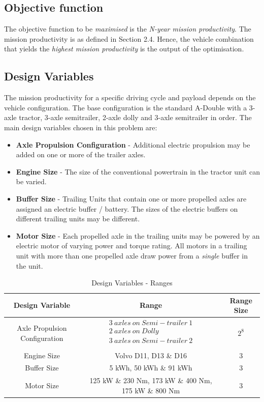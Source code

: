 \documentclass[ExampleMasters.tex]{subfiles}
\begin{document}
		\subsection{Objective function}
			The objective function to be \textit{maximised} is the \textit{N-year mission productivity}. The mission productivity is as defined in Section 2.4. Hence, the vehicle combination that yields the \textit{highest mission productivity} is the output of the optimisation.

		\subsection{Design Variables}
			The mission productivity for a specific driving cycle and payload depends on the vehicle configuration. The base configuration is the standard A-Double with a 3-axle tractor, 3-axle semitrailer, 2-axle dolly and 3-axle semitrailer in order. The main design variables chosen in this problem are:

			\begin{itemize}
				\item \textbf{Axle Propulsion Configuration} - Additional electric propulsion may be added on one or more of the trailer axles.
				\item \textbf{Engine Size} - The size of the conventional powertrain in the tractor unit can be varied.
				\item \textbf{Buffer Size} - Trailing Units that contain one or more propelled axles are assigned an electric buffer / battery. The sizes of the electric buffers on different trailing units may be different.
				\item \textbf{Motor Size} - Each propelled axle in the trailing units may be powered by an electric motor of varying power and torque rating. All motors in a trailing unit with more than one propelled axle draw power from a \textit{single} buffer in the unit.
			\end{itemize}

			\begin{table}[ht]
				\caption{Design Variables - Ranges}
				\centering
				\begin{tabular}{c c c}
				\hline\hline
				Design Variable & Range & Range Size \\
				\hline
				Axle Propulsion Configuration & $\begin{matrix}
													3\ axles\ on\ Semi-trailer\ 1\\
													2\ axles\ on\ Dolly\\
													3\ axles\ on\ Semi-trailer\ 2\\
												\end{matrix}$ & $2^8$\\
				Engine Size & Volvo D11, D13 \& D16 & 3\\
				Buffer Size & 5 kWh, 50 kWh \& 91 kWh & 3\\
				Motor Size & 125 kW \& 230 Nm, 173 kW \& 400 Nm, 175 kW \& 800 Nm & 3 \\
				\hline
				\end{tabular}
				\label{table:designParameters}
			\end{table}
\end{document}
